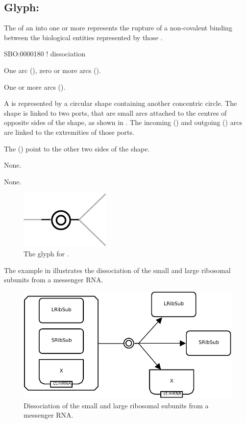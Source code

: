 \subsection{Glyph: }
\label{sec:dissociation}

The  of an  into one or more  represents the rupture of a non-covalent binding between the biological entities represented by those .

\begin{glyphDescription}

\glyphSboTerm
SBO:0000180 ! dissociation


\glyphIncoming
One  arc (), zero or more  arcs ().



\glyphOutgoing
One or more  arcs ().


\glyphContainer
A  is represented by a circular shape containing another concentric circle.
The shape is linked to two ports, that are small arcs attached to the centres of opposite sides of the shape, as shown in .
The incoming  () and outgoing  () arcs are linked to the extremities of those ports.

The  () point to the other two sides of the shape.

\glyphLabel
None.

\glyphAux
None.

\end{glyphDescription}

\begin{figure}[H]
  \centering
  \includegraphics{images/build/dissociation.pdf}
  \caption{The \PD glyph for .}
  \label{fig:dissociation}
\end{figure}

The example in  illustrates the dissociation of the small and large ribosomal subunits from a messenger RNA.

\begin{figure}[H]
  \centering
  \includegraphics[scale = 0.8]{images/build/dissociation_ribosome_example.pdf}
  \caption{Dissociation of the small and large ribosomal subunits from a messenger RNA.}
  \label{fig:dissoc-ribo}
\end{figure}
